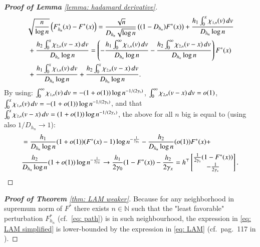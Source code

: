 \begin{proof}[\hypertarget{proof of lemma 10}{\textbf{Proof of Lemma}} \ref{lemma: hadamard derivative}]
\begin{align*}
&\sqrt{\frac{n}{\log{n}}} \left( F^*_{h_n}(x)-F^*(x) \right) = \frac{\sqrt{n}}{D_{h_n}\sqrt{\log{n}}} \left( (1- D_{h_n})F^*(x) \right) + \frac{h_1 \int_{0}^{x} \chi_{{\scaleto{1,n}{4.5pt}}}(v)  \, dv}{D_{h_n} \log{n}}\\
& \: + \frac{h_2 \int_{0}^{x} \chi_{{\scaleto{2,n}{4.5pt}}}(v-x)  \, dv}{D_{h_n} \log{n}} = \left(-\frac{h_1 \int_{0}^{\infty} \chi_{{\scaleto{1,n}{4.5pt}}}(v)  \, dv}{D_{h_n} \log{n}} - \frac{h_2 \int_{0}^{\infty} \chi_{{\scaleto{2,n}{4.5pt}}}(v-x)  \, dv}{D_{h_n} \log{n}} \right) F^*(x) \\
& \: + \frac{h_1 \int_{0}^{x} \chi_{{\scaleto{1,n}{4.5pt}}}(v)  \, dv}{D_{h_n} \log{n}} + \frac{h_2 \int_{0}^{x} \chi_{{\scaleto{2,n}{4.5pt}}}(v-x)  \, dv}{D_{h_n} \log{n}}. 
\end{align*}
By using: $\int_{0}^{\infty} \chi_{{\scaleto{1,n}{4.5pt}}}(v)  \, dv = - (1 + o(1)) \log{n^{-1/(2\gamma_{\scaleto{0}{2.5pt}})}}$, $\int_{0}^{\infty}\chi_{{\scaleto{2,n}{4.5pt}}}(v-x)  \, dv = o(1)$,  $\int_{0}^{x} \chi_{{\scaleto{1,n}{4.5pt}}}(v)  \, dv = -(1 + o(1)) \log{n^{-1/(2\gamma_{\scaleto{0}{2.5pt}})}}$, and that $\int_{0}^{x} \chi_{{\scaleto{2,n}{4.5pt}}}(v-x)  \, dv = (1 + o(1)) \log{n^{-1/(2\gamma_{\scaleto{x}{2.2pt}})}}$, the above for all $n$ big is equal to (using also $1/D_{h_n} \rightarrow 1$):
\begin{align*}
    &=\frac{h_1}{D_{h_n} \log{n}} (1 + o(1)) (F^*(x)-1) \log{n^{-\frac{1}{2\gamma_{\scaleto{0}{2.5pt}}}}} - \frac{h_2}{D_{h_n} \log{n}} ( o(1)) F^*(x)  +\\
    &  \frac{h_2}{D_{h_n} \log{n}}(1 + o(1)) \log{n^{-\frac{1}{2\gamma_{\scaleto{x}{2.5pt}}}}} \rightarrow \frac{h_1}{2\gamma_0} (1-F^*(x)) - \frac{h_2}{2\gamma_x} = h^{\top} \begin{bmatrix} \frac{1}{2\gamma_{\scaleto{0}{2.5pt}}} (1-F^*(x)) \\ - \frac{1}{2\gamma_{\scaleto{x}{2.2pt}}} \end{bmatrix}.
\end{align*}
\end{proof}

\begin{proof}[\hypertarget{proof of thm 2}{\textbf{Proof of Theorem}} \ref{thm: LAM weaker}]
Because for any neighborhood in supremum norm of $F^*$ there exists $n \in \mathbb{N}$ such that the "least favorable" perturbation $F^*_{h_n}$ (cf.\ \eqref{eq: path}) is in such neighbourhood, the expression in \eqref{eq: LAM simplified} is lower-bounded by the expression in \eqref{eq: LAM} (cf.\ pag.\ 117 in \cite{6}).
\end{proof}


